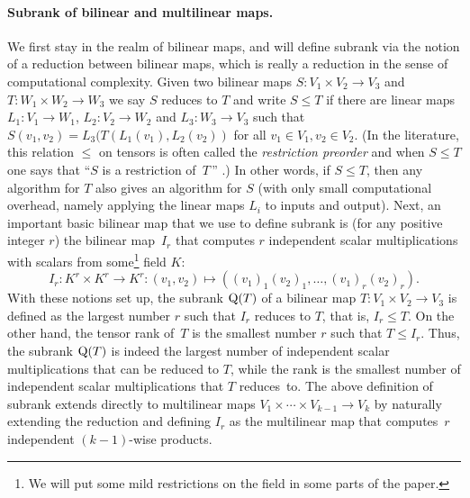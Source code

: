 \documentclass[10pt,a4paper]{article}
\theoremstyle{definition}
\theoremstyle{remark}
\newcommand{\subrank}{{\rm Q}}
\begin{document}
\paragraph{Subrank of bilinear and multilinear maps.}
We first stay in the realm of bilinear maps, and will define subrank via the notion of a reduction between bilinear maps, which is really a reduction in the sense of computational complexity. Given two bilinear maps $S : V_1 \times V_2 \to V_3$ and $T : W_1 \times W_2 \to W_3$ we say $S$ reduces to $T$ and write $S\leq T$ if there are linear maps $L_1 : V_1 \to W_1$, $L_2 : V_2 \to W_2$ and $L_3 : W_3 \to V_3$ such that $S(v_1, v_2) = L_3(T(L_1(v_1), L_2(v_2))$ for all $v_1 \in V_1, v_2 \in V_2$. (In the literature, this relation $\leq$ on tensors is often called the \emph{restriction preorder} and when $S \leq T$ one says that ``$S$ is a restriction of~$T$\,'' \cite{strassen1987relative,burgisser1997algebraic}.) In other words, if $S \leq T$, then any algorithm for $T$ also gives an algorithm for $S$ (with only small computational overhead, namely applying the linear maps $L_i$ to inputs and output). Next, an important basic bilinear map that we use to define subrank is (for any positive integer $r$) the bilinear map~$I_r$ that computes $r$ independent scalar multiplications with scalars from some\footnote{We will put some mild restrictions on the field in some parts of the paper.} field $K$: 
\[
I_r : K^r \times K^r \to K^r : (v_1, v_2) \mapsto ( (v_1)_1 (v_2)_1, \ldots, (v_1)_r (v_2)_r ).
\]
With these notions set up, the subrank $\subrank(T)$ of a bilinear map $T : V_1 \times V_2 \to V_3$ is defined as the largest number $r$ such that $I_r$ reduces to $T$, that is, $I_r \leq T$.
On the other hand, the tensor rank of~$T$ is the smallest number $r$ such that $T \leq I_r$. Thus, the subrank $\subrank(T)$ is indeed the largest number of independent scalar multiplications that can be reduced to $T$, while the rank is the smallest number of independent scalar multiplications that $T$ reduces~to.
%
The above definition of subrank extends directly to multilinear maps $V_1 \times \cdots \times V_{k-1} \to V_k$ by naturally extending the reduction and defining 
$I_r$ as the multilinear map that computes~$r$ independent $(k-1)$-wise products.
%
%
%
%
%
%
%
%
%
\end{document}

